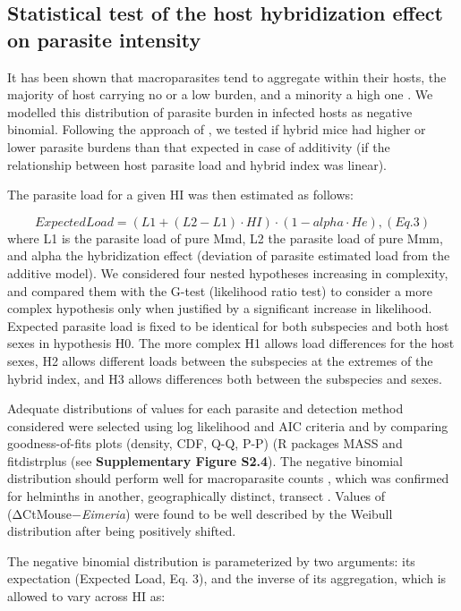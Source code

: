 \subsection{Statistical test of the host hybridization effect on parasite intensity}
It has been shown that macroparasites tend to aggregate within their hosts, the majority of host carrying no or a low burden, and a minority a high one \citep{shaw_patterns_1995}. We modelled this distribution of parasite burden in infected hosts as negative binomial. Following the approach of \cite{baird_where_2012}, we tested if hybrid mice had higher or lower parasite burdens than that expected in case of additivity (if the relationship between host parasite load and hybrid index was linear). 
\par The parasite load for a given HI was then estimated as follows:

\[ExpectedLoad = (L1 + (L2 − L1) · HI) · (1 − alpha · He) ,           (Eq. 3)\]
where L1 is the parasite load of pure Mmd, L2 the parasite load of pure Mmm, and alpha the hybridization effect (deviation of parasite estimated load from the additive model). We considered four nested hypotheses increasing in complexity, and compared them with the G-test (likelihood ratio test) to consider a more complex hypothesis only when justified by a significant increase in likelihood. Expected parasite load is fixed to be identical for both subspecies and both host sexes in hypothesis H0. The more complex H1 allows load differences for the host sexes, H2 allows different loads between the subspecies at the extremes of the hybrid index, and H3 allows differences both between the subspecies and sexes.
\par Adequate distributions of values for each parasite and detection method considered were selected using log likelihood and AIC criteria and by comparing goodness-of-fits plots (density, CDF, Q-Q, P-P) (R packages MASS \citep{venables_modern_2002} and fitdistrplus \citep{delignette-muller_fitdistrplus_2015} (see \textbf{Supplementary Figure S2.4}). The negative binomial distribution should perform well for macroparasite counts \citep{crofton_quantitative_1971, shaw_patterns_1995}, which was confirmed for helminths in another, geographically distinct, transect \citep{baird_where_2012}. Values of (ΔCtMouse−\textit{Eimeria}) were found to be well described by the Weibull distribution after being positively shifted. 
\par The negative binomial distribution is parameterized by two arguments: its expectation (Expected Load, Eq. 3), and the inverse of its aggregation, which is allowed to vary across HI as:

